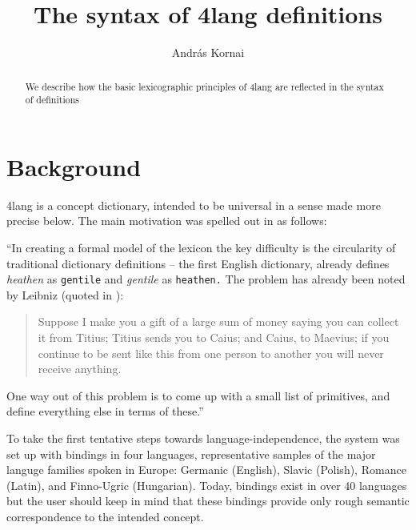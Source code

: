 \documentclass[11pt,bookmarks,bookmarksnumbered,naturalnames,plainpages=false,pdftex,colorlinks=true,urlcolor=blue,bookmarksdepth=subsection,plainpages=false]{paper}
\begin{document}
 
\title{The syntax of 4lang definitions}
\author{Andr\'as Kornai}
\date{}
\maketitle

\begin{abstract}
We describe how the basic lexicographic principles of 4lang are reflected in
the syntax of definitions
\end{abstract}

\section*{Background}

4lang is a concept dictionary, intended to be universal in a sense made more
precise below. The main motivation was spelled out in \citep{Kornai:2010}
as follows:

``In creating a formal model of the lexicon the key difficulty is the
circularity of traditional dictionary definitions -- the first English
dictionary, \cite{Cawdrey:1604} already defines {\it heathen}
as {\tt gentile} and {\it gentile} as {\tt heathen.} The problem has already
been noted by Leibniz (quoted in \cite{Wierzbicka:1985}):

\begin{quote}
Suppose I make you a gift of a large sum of money saying you can collect it
from Titius; Titius sends you to Caius; and Caius, to Maevius; if you continue
to be sent like this from one person to another you will never receive
anything.
\end{quote}

\noindent
One way out of this problem is to come up with a small list of primitives, and
define everything else in terms of these.'' 

To take the first tentative steps towards language-independence, the system
was set up with bindings in four languages, representative samples of the
major languge families spoken in Europe: Germanic (English), Slavic (Polish),
Romance (Latin), and Finno-Ugric (Hungarian). Today, bindings exist in over 40
languages \citep{Acs:2013}  but the user should keep in mind that these 
bindings provide only rough semantic correspondence to the intended concept. 
\end{document}
